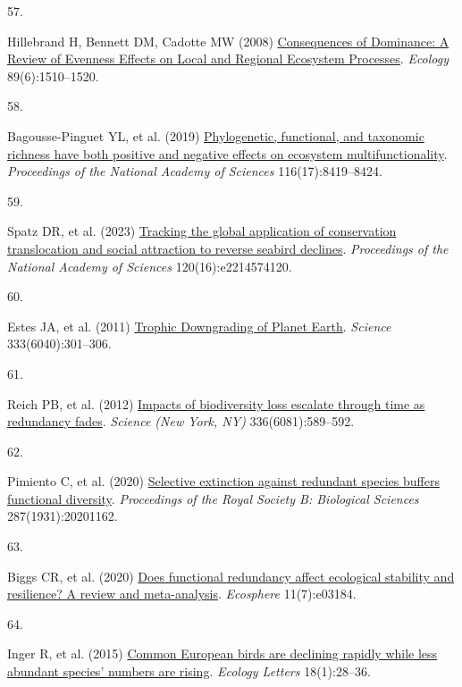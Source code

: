 \documentclass{article}
\newlength{\cslhangindent}
\newlength{\csllabelwidth}
\newlength{\cslentryspacingunit} %
\newenvironment{CSLReferences}[2] %
 {%
  \setlength{\parindent}{0pt}
  \ifodd #1
  \let\oldpar\par
  \def\par{\hangindent=\cslhangindent\oldpar}
  \fi
  \setlength{\parskip}{#2\cslentryspacingunit}
 }%
 {}
\newcommand{\CSLLeftMargin}[1]{\parbox[t]{\csllabelwidth}{#1}}
\newcommand{\CSLRightInline}[1]{\parbox[t]{\linewidth - \csllabelwidth}{#1}\break}
\begin{document}
\begin{CSLReferences}{0}{0}
\leavevmode{}%
\CSLLeftMargin{57. }%
\CSLRightInline{Hillebrand H, Bennett DM, Cadotte MW (2008)
\href{https://doi.org/10.1890/07-1053.1}{Consequences of Dominance: A
Review of Evenness Effects on Local and Regional Ecosystem Processes}.
\emph{Ecology} 89(6):1510--1520.}

\leavevmode{}%
\CSLLeftMargin{58. }%
\CSLRightInline{Bagousse-Pinguet YL, et al. (2019)
\href{https://doi.org/10.1073/pnas.1815727116}{Phylogenetic, functional,
and taxonomic richness have both positive and negative effects on
ecosystem multifunctionality}. \emph{Proceedings of the National Academy
of Sciences} 116(17):8419--8424.}

\leavevmode{}%
\CSLLeftMargin{59. }%
\CSLRightInline{Spatz DR, et al. (2023)
\href{https://doi.org/10.1073/pnas.2214574120}{Tracking the global
application of conservation translocation and social attraction to
reverse seabird declines}. \emph{Proceedings of the National Academy of
Sciences} 120(16):e2214574120.}

\leavevmode{}%
\CSLLeftMargin{60. }%
\CSLRightInline{Estes JA, et al. (2011)
\href{https://doi.org/10.1126/science.1205106}{Trophic Downgrading of
Planet Earth}. \emph{Science} 333(6040):301--306.}

\leavevmode{}%
\CSLLeftMargin{61. }%
\CSLRightInline{Reich PB, et al. (2012)
\href{https://doi.org/10.1126/science.1217909}{Impacts of biodiversity
loss escalate through time as redundancy fades}. \emph{Science (New
York, NY)} 336(6081):589--592.}

\leavevmode{}%
\CSLLeftMargin{62. }%
\CSLRightInline{Pimiento C, et al. (2020)
\href{https://doi.org/10.1098/rspb.2020.1162}{Selective extinction
against redundant species buffers functional diversity}.
\emph{Proceedings of the Royal Society B: Biological Sciences}
287(1931):20201162.}

\leavevmode{}%
\CSLLeftMargin{63. }%
\CSLRightInline{Biggs CR, et al. (2020)
\href{https://doi.org/10.1002/ecs2.3184}{Does functional redundancy
affect ecological stability and resilience? A review and meta-analysis}.
\emph{Ecosphere} 11(7):e03184.}

\leavevmode{}%
\CSLLeftMargin{64. }%
\CSLRightInline{Inger R, et al. (2015)
\href{https://doi.org/10.1111/ele.12387}{Common European birds are
declining rapidly while less abundant species' numbers are rising}.
\emph{Ecology Letters} 18(1):28--36.}


\end{CSLReferences}
\end{document}
